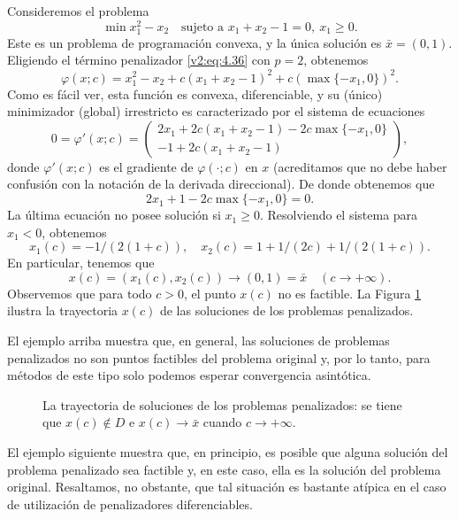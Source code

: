 \begin{example}\label{v2:exa:4.3.1}
    Consideremos el problema
    \[
        \min x_1^2 - x_2 \quad \text{sujeto a } x_1 + x_2 - 1 = 0, \ x_1 \ge 0.
    \]
    Este es un problema de programación convexa, y la única solución es $\bar{x} = (0, 1)$.
    Eligiendo el término penalizador \eqref{v2:eq:4.36} con $p = 2$, obtenemos
    \[
        \varphi(x; c) = x_1^2 - x_2 + c(x_1 + x_2 - 1)^2 + c(\max\{-x_1, 0\})^2.
    \]
    Como es fácil ver, esta función es convexa, diferenciable, y su (único) minimizador (global) irrestricto es caracterizado por el sistema de ecuaciones
    \[
        0 = \varphi'(x; c) = \begin{pmatrix} 2x_1 + 2c(x_1 + x_2 - 1) - 2c\max\{-x_1, 0\} \\ -1 + 2c(x_1 + x_2 - 1) \end{pmatrix},
    \]
    donde $\varphi'(x; c)$ es el gradiente de $\varphi(\cdot; c)$ en $x$ (acreditamos que no debe haber confusión con la notación de la derivada direccional).
    De donde obtenemos que
    \[
        2x_1 + 1 - 2c\max\{-x_1, 0\} = 0.
    \]
    La última ecuación no posee solución si $x_1 \ge 0$. Resolviendo el sistema para $x_1 < 0$, obtenemos
    \[
        x_1(c) = -1 / (2(1 + c)), \quad x_2(c) = 1 + 1/(2c) + 1 / (2(1 + c)).
    \]
    En particular, tenemos que
    \[
        x(c) = (x_1(c), x_2(c)) \to (0, 1) = \bar{x} \quad (c \to +\infty).
    \]
    Observemos que para todo $c > 0$, el punto $x(c)$ no es factible. La Figura \ref{v2:fig:4.3.4} ilustra la trayectoria $x(c)$ de las soluciones de los problemas penalizados.

    El ejemplo arriba muestra que, en general, las soluciones de problemas penalizados no son puntos factibles del problema original y, por lo tanto, para métodos de este tipo solo podemos esperar convergencia asintótica.
\end{example}

\begin{figure}[htpb]
    \centering
    \caption{La trayectoria de soluciones de los problemas penalizados: se tiene que $x(c) \notin D$ e $x(c) \to \bar{x}$ cuando $c \to +\infty$.}
    \label{v2:fig:4.3.4}
\end{figure}

El ejemplo siguiente muestra que, en principio, es posible que alguna solución del problema penalizado sea factible y, en este caso, ella es la solución del problema original. Resaltamos, no obstante, que tal situación es bastante atípica en el caso de utilización de penalizadores diferenciables.

